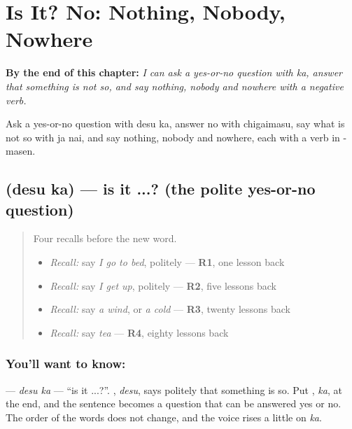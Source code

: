 
\chapter{Is It? No: Nothing, Nobody, Nowhere}
\label{ch:ja-is-it-no-nothing-nobody-nowhere}

\begin{chapteropening}
\textbf{By the end of this chapter:} \emph{I can ask a yes-or-no question with ka, answer that something is not so, and say nothing, nobody and nowhere with a negative verb.}

Ask a yes-or-no question with desu ka, answer no with chigaimasu, say what is not so with ja nai, and say nothing, nobody and nowhere, each with a verb in -masen.
\end{chapteropening}

\section[\texorpdfstring{\ja{ですか} (desu ka)}{ですか (desu ka)}]{ (desu ka) — is it ...? (the polite yes-or-no question)}

\label{lesson:JA-C139-desuka}



\begin{quote}
Four recalls before the new word.

\begin{itemize}
\raggedright
  \item \emph{Recall:} say \emph{I go to bed}, politely — \textbf{R1}, one lesson back
  \item \emph{Recall:} say \emph{I get up}, politely — \textbf{R2}, five lessons back
  \item \emph{Recall:} say \emph{a wind}, or \emph{a cold} — \textbf{R3}, twenty lessons back
  \item \emph{Recall:} say \emph{tea} — \textbf{R4}, eighty lessons back
\end{itemize}
\end{quote}

\subsection*{You'll want to know: }
\textbf{} — \emph{desu ka} — \textquotedblleft{}is it ...?\textquotedblright{}. \textbf{}, \emph{desu}, says politely that something is so. Put \textbf{}, \emph{ka}, at the end, and the sentence becomes a question that can be answered yes or no. The order of the words does not change, and the voice rises a little on \emph{ka}.

